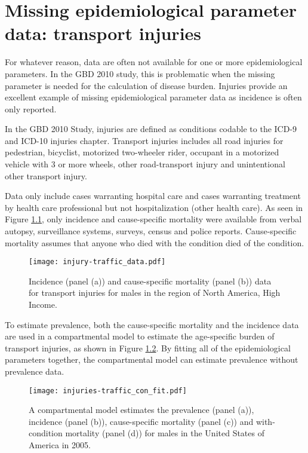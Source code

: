 \chapter{Missing epidemiological parameter data: transport injuries}
\label{applications-double_dismod}

For whatever reason, data are often not available for one or more
epidemiological parameters.  In the GBD 2010 study, this is
problematic when the missing parameter is needed for the calculation
of disease burden.  Injuries provide an excellent example of missing
epidemiological parameter data as incidence is often only reported.

In the GBD 2010 Study, injuries are defined as conditions codable to
the ICD-9 and ICD-10 injuries chapter.  Transport injuries includes
all road injuries for pedestrian, bicyclist, motorized two-wheeler
rider, occupant in a motorized vehicle with 3 or more wheels, other
road-transport injury and unintentional other transport injury.

Data only include cases warranting hospital care and cases warranting
treatment by health care professional but not hospitalization (other
health care).  As seen in Figure \ref{fig:app-injury traffic data},
only incidence and cause-specific mortality were available from verbal
autopsy, surveillance systems, surveys, census and police reports.
Cause-specific mortality assumes that anyone who died with the
condition died of the condition.

    \begin{figure}[h]
        \begin{center}
            \texttt{[image: injury-traffic\_data.pdf]}
            \caption{Incidence (panel (a)) and cause-specific
              mortality (panel (b)) data for transport injuries for
              males in the region of North America, High Income.}
            \label{fig:app-injury traffic data}
        \end{center}
    \end{figure}

To estimate prevalence, both the cause-specific mortality and the
incidence data are used in a compartmental model to estimate the
age-specific burden of transport injuries, as shown in Figure
\ref{fig:app-injury traffic fit}.  By fitting all of the epidemiological
parameters together, the compartmental model can estimate prevalence
without prevalence data.

    \begin{figure}[h]
        \begin{center}
            \texttt{[image: injuries-traffic\_con\_fit.pdf]}
            \caption{A compartmental model estimates the prevalence
              (panel (a)), incidence (panel (b)), cause-specific
              mortality (panel (c)) and with-condition mortality
              (panel (d)) for males in the United States of America in
              2005.}
            \label{fig:app-injury traffic fit}
        \end{center}
    \end{figure}


